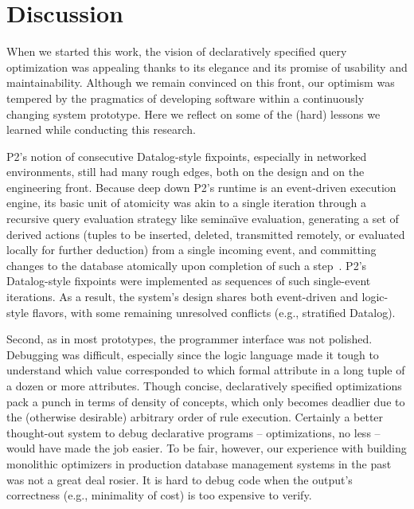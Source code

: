 \section{Discussion}
\label{ch:opt:sec:discussion}

When we started this work, the vision of declaratively specified query
optimization was appealing thanks to its elegance and its promise of usability
and maintainability.  Although we remain convinced on this front, our optimism
was tempered by the pragmatics of developing software within a continuously
changing system prototype.  Here we reflect on some of the (hard) lessons we
learned while conducting this research.

P2's notion of consecutive Datalog-style fixpoints, especially in networked
environments, still had many rough edges, both on the design and on the
engineering front.  Because deep down P2's runtime is an event-driven execution
engine, its basic unit of atomicity was akin to a single iteration through a
recursive query evaluation strategy like semina\"{\i}ve evaluation, generating a
set of derived actions (tuples to be inserted, deleted, transmitted remotely,
or evaluated locally for further deduction) from a single incoming event, and
committing changes to the database atomically upon completion of such a
step~\cite{LuThesis}.  P2's Datalog-style fixpoints were implemented as
sequences of such single-event iterations.  As a result, the system's design
shares both event-driven and logic-style flavors, with some remaining
unresolved conflicts (e.g., stratified Datalog).


Second, as in most prototypes, the programmer interface was not polished.
Debugging was difficult, especially since the logic language made it tough to
understand which value corresponded to which formal attribute in a long tuple of
a dozen or more attributes.  Though concise, declaratively specified
optimizations pack a punch in terms of density of concepts, which only becomes
deadlier due to the (otherwise desirable) arbitrary order of rule execution.
Certainly a better thought-out system to debug declarative programs --
optimizations, no less -- would have made the job easier.  To be fair, however,
our experience with building monolithic optimizers in production database
management systems in the past was not a great deal rosier.  It is hard to
debug code when the output's correctness (e.g., minimality of cost) is too
expensive to verify.

